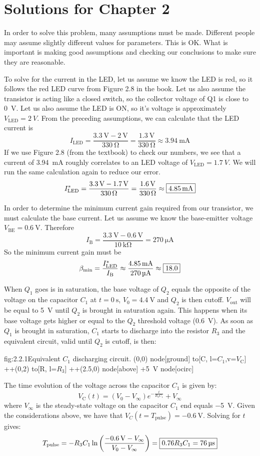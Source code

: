 \chapter{Solutions for Chapter 2}

In order to solve this problem, many assumptions must be made.
Different people may assume slightly different values for parameters.
This is OK.
What is important is making good assumptions and checking our conclusions to make sure they are reasonable.

To solve for the current in the LED, let us assume we know the LED is red, so it follows the red LED curve from Figure 2.8 in the book.
Let us also assume the transistor is acting like a closed switch, so the collector voltage of Q1 is close to \SI{0}{\V}.
Let us also assume the LED is ON, so it's voltage is approximately $V_\text{LED} = \SI{2}{V}$. From the preceding assumptions, we can calculate that the LED current is
\[I_\text{LED} = \frac{\SI{3.3}{\V} - \SI{2}{\V}}{\SI{330}{\ohm}} = \frac{\SI{1.3}{\V}}{\SI{330}{\ohm}} \approx \SI{3.94}{\mA}\]
If we use Figure 2.8 (from the textbook) to check our numbers, we see that a current of \SI{3.94}{\mA} roughly correlates to an LED voltage of $V_\text{LED} = \SI{1.7}{V}$.  We will run the same calculation again to reduce our error.
\[I^{*}_\text{LED} = \frac{\SI{3.3}{\V} - \SI{1.7}{\V}}{\SI{330}{\ohm}} = \frac{\SI{1.6}{\V}}{\SI{330}{\ohm}} \approx \mans{\SI{4.85}{\mA}}\]

In order to determine the minimum current gain required from our transistor, we must calculate the base current.
Let us assume we know the base-emitter voltage $V_\text{BE} = \SI{0.6}{\V}$.
Therefore
\[I_\text{B} = \frac{\SI{3.3}{\V} - \SI{0.6}{\V}}{\SI{10}{\kohm}} = \SI{270}{\uA}\]
So the minimum current gain must be
\[\beta_\text{min} = \frac{I^{*}_\text{LED}}{I_\text{B}} \approx \frac{\SI{4.85}{\mA}}{\SI{270}{\uA}} \approx \mans{18.0}\]


When $Q_1$ goes is in saturation, the base voltage of $Q_2$ equals the opposite of the voltage on the capacitor $C_1$ at $t = \SI{0}{\second}$, $V_0 = \SI{4.4}{\volt}$ and $Q_2$ is then cutoff. $V_\text{out}$ will be equal to \SI{5}{\volt} until $Q_2$ is brought in saturation again. This happens when its base voltage gets higher or equal to the $Q_2$ threshold voltage (\SI{0.6}{\volt}). As soon as $Q_1$ is brought in saturation, $C_1$ starts to discharge into the resistor $R_3$ and the equivalent circuit, valid until $Q_2$ is cutoff, is then:
\begin{circuit}{fig:2.2.1}{Equivalent $C_1$ discharging circuit.}
    (0,0) node[ground] {}
    to[C, l=$C_1$,v=$V_\text{C}$] ++(0,2)
    to[R, l=$R_3$] ++(2.5,0)
    node[above] {+\SI{5}{\volt}} node[ocirc] {}
\end{circuit}
The time evolution of the voltage across the capacitor $C_1$ is given by:
\[V_\text{C}(t)=\left(V_0-V_\infty\right)e^{-\frac{t}{R_3C_1}}+V_\infty\]
where $V_\infty$ is the steady-state voltage on the capacitor $C_1$ end equals \SI{-5}{\volt}. Given the considerations above, we have that $V_C(t=T_\text{pulse})=\SI{-0.6}{\volt}$. Solving for $t$ gives:
\[T_\text{pulse}=-R_3C_1\ln\left(\frac{\SI{-0.6}{\volt}-V_\infty}{{V_0-V_\infty}}\right)=\boxed{0.76R_3C_1=\SI{76}{\micro\second}}\]


